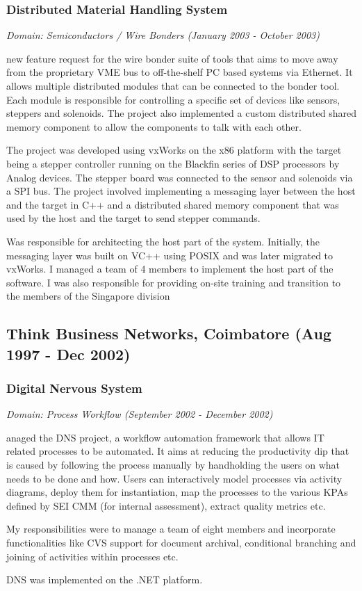 \documentclass[a4paper,11pt]{article}
\newcommand\cvsubsection[3]{\subsection*{#1 \quad \small{(#2 - #3)}}}
\newcommand\cvprojectentry[5]{
  \subsubsection*{#1}
  
  \vspace{-7pt}
  
  \it{Domain: #2}\normalfont{} \quad (#3 - #4)
  
}
\begin{document}
\begin{multicols}{2}
\cvprojectentry{Distributed Material Handling System}{Semiconductors / Wire Bonders}{January 2003}{October 2003}

A new feature request for the wire bonder suite of tools that aims to
move away from the proprietary VME bus to off-the-shelf PC based
systems via Ethernet. It allows multiple distributed modules that can
be connected to the bonder tool. Each module is responsible for
controlling a specific set of devices like sensors, steppers and
solenoids. The project also implemented a custom distributed shared
memory component to allow the components to talk with each other.
 
The project was developed using vxWorks on the x86 platform with the
target being a stepper controller running on the Blackfin series of
DSP processors by Analog devices. The stepper board was connected to
the sensor and solenoids via a SPI bus. The project involved
implementing a messaging layer between the host and the target in C++
and a distributed shared memory component that was used by the host
and the target to send stepper commands.
 
Was responsible for architecting the host part of the
system. Initially, the messaging layer was built on VC++ using POSIX
and was later migrated to vxWorks. I managed a team of 4 members to
implement the host part of the software. I was also responsible for
providing on-site training and transition to the members of the
Singapore division

\cvsubsection{Think Business Networks, Coimbatore}{Aug 1997}{Dec 2002}

\cvprojectentry{Digital Nervous System}{Process Workflow}{September 2002}{December 2002}
 
Managed the DNS project, a workflow automation framework that allows
IT related processes to be automated. It aims at reducing the
productivity dip that is caused by following the process manually by
handholding the users on what needs to be done and how. Users can
interactively model processes via activity diagrams, deploy them for
instantiation, map the processes to the various KPAs defined by SEI
CMM (for internal assessment), extract quality metrics etc.
 
My responsibilities were to manage a team of eight members and
incorporate functionalities like CVS support for document archival,
conditional branching and joining of activities within processes etc.
 
DNS was implemented on the .NET platform. 
 

\end{multicols}
\end{document}
